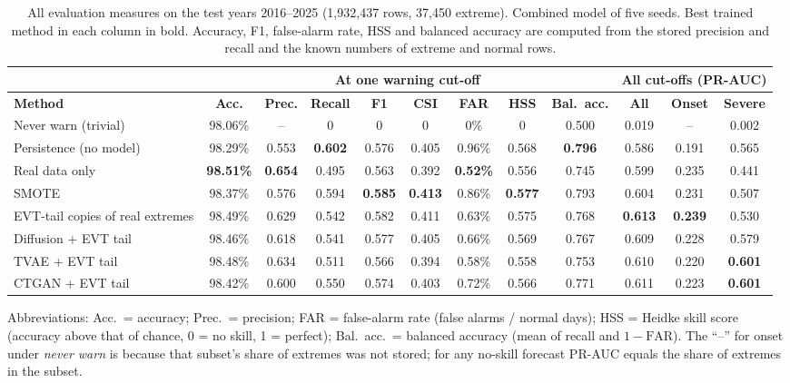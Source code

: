 \documentclass[12pt,a4paper]{report}
\begin{document}
\begin{table}[H]
\centering
\caption{All evaluation measures on the test years 2016--2025 (1{,}932{,}437 rows, 37{,}450 extreme). Combined model of
five seeds. Best trained method in each column in bold. Accuracy, F1, false-alarm rate, HSS and balanced accuracy are
computed from the stored precision and recall and the known numbers of extreme and normal rows.}
\label{tab:allmetrics}
\scriptsize
\setlength{\tabcolsep}{3.2pt}
\begin{tabular}{|l|c|c|c|c|c|c|c|c||c|c|c|}
\hline
 & \multicolumn{8}{c||}{\textbf{At one warning cut-off}} & \multicolumn{3}{c|}{\textbf{All cut-offs (PR-AUC)}}\\ \hline
\textbf{Method} & \textbf{Acc.} & \textbf{Prec.} & \textbf{Recall} & \textbf{F1} & \textbf{CSI} & \textbf{FAR} & \textbf{HSS} & \textbf{Bal.\ acc.} & \textbf{All} & \textbf{Onset} & \textbf{Severe}\\ \hline
Never warn (trivial) & 98.06\% & -- & 0 & 0 & 0 & 0\% & 0 & 0.500 & 0.019 & -- & 0.002\\ \hline
Persistence (no model) & 98.29\% & 0.553 & \textbf{0.602} & 0.576 & 0.405 & 0.96\% & 0.568 & \textbf{0.796} & 0.586 & 0.191 & 0.565\\ \hline
Real data only & \textbf{98.51\%} & \textbf{0.654} & 0.495 & 0.563 & 0.392 & \textbf{0.52\%} & 0.556 & 0.745 & 0.599 & 0.235 & 0.441\\ \hline
SMOTE & 98.37\% & 0.576 & 0.594 & \textbf{0.585} & \textbf{0.413} & 0.86\% & \textbf{0.577} & 0.793 & 0.604 & 0.231 & 0.507\\ \hline
EVT-tail copies of real extremes & 98.49\% & 0.629 & 0.542 & 0.582 & 0.411 & 0.63\% & 0.575 & 0.768 & \textbf{0.613} & \textbf{0.239} & 0.530\\ \hline
Diffusion + EVT tail & 98.46\% & 0.618 & 0.541 & 0.577 & 0.405 & 0.66\% & 0.569 & 0.767 & 0.609 & 0.228 & 0.579\\ \hline
TVAE + EVT tail & 98.48\% & 0.634 & 0.511 & 0.566 & 0.394 & 0.58\% & 0.558 & 0.753 & 0.610 & 0.220 & \textbf{0.601}\\ \hline
CTGAN + EVT tail & 98.42\% & 0.600 & 0.550 & 0.574 & 0.403 & 0.72\% & 0.566 & 0.771 & 0.611 & 0.223 & \textbf{0.601}\\ \hline
\end{tabular}
\end{table}

\noindent Abbreviations: Acc.\ = accuracy; Prec.\ = precision; FAR = false-alarm rate (false alarms / normal days);
HSS = Heidke skill score (accuracy above that of chance, 0 = no skill, 1 = perfect); Bal.\ acc.\ = balanced accuracy
(mean of recall and $1-\mathrm{FAR}$). The ``--'' for onset under \emph{never warn} is because that subset's share of
extremes was not stored; for any no-skill forecast PR-AUC equals the share of extremes in the subset.
\end{document}
